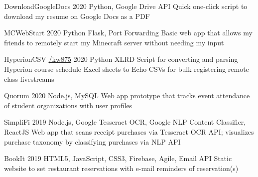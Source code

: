 

\begin{cvprojects}
  \cvproject
  {DownloadGoogleDocs} %
  {\href{https://github.com/KevinIsMyName/DownloadGoogleDocs}{\faGithubSquare\acvHeaderIconSep\@KevinIsMyName}} %
  {2020} %
  {Python, Google Drive API} %
  {Quick one-click script to download my resume on Google Docs as a PDF}

  \cvproject
  {MCWebStart} %
  {\href{https://github.com/KevinIsMyName/MCWebStart}{\faGithubSquare\acvHeaderIconSep\@KevinIsMyName}} %
  {2020} %
  {Python Flask, Port Forwarding} %
  {Basic web app that allows my friends to remotely start my Minecraft server without needing my input}

  \cvproject
  {HyperionCSV}
  {\href{https://github.com/KevinIsMyName/HyperionCSV}{\faGithubSquare\acvHeaderIconSep\@KevinIsMyName/kw875}}
  {2020}
  {Python XLRD}
  {Script for converting and parsing Hyperion course schedule Excel sheets to Echo CSVs for bulk registering remote class livestreams}

  \cvproject
  {Quorum}
  {\href{https://github.com/KevinIsMyName/Quorum}{\faGithubSquare\acvHeaderIconSep\@KevinIsMyName}}
  {2020}
  {Node.js, MySQL}
  {Web app prototype that tracks event attendance of student organizations with user profiles}

  \cvproject
  {SimpliFi}
  {\href{https://github.com/unitehenry/simply-finance}{\faGithubSquare\acvHeaderIconSep{}}}
  {2019}
  {Node.js, Google Tesseract OCR, Google NLP Content Classifier, ReactJS}
  {Web app that scans receipt purchases via Tesseract OCR API; visualizes purchase taxonomy by classifying purchases via NLP API}

  \cvproject
  {BookIt}
  {\href{https://github.com/KevinIsMyName/BookIt}{\faGithubSquare\acvHeaderIconSep{}}}
  {2019}
  {HTML5, JavaScript, CSS3, Firebase, Agile, Email API}
  {Static website to set restaurant reservations with e-mail reminders of reservation(s)}

\end{cvprojects}